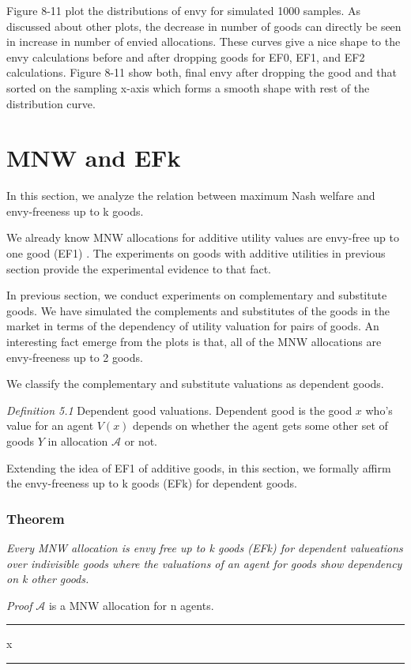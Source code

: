 Figure 8-11 plot the distributions of envy for simulated 1000 samples. As discussed about other plots, the decrease in number of goods can directly be seen in increase in number of envied allocations. These curves give a nice shape to the envy calculations before and after dropping goods for EF0, EF1, and EF2 calculations. Figure 8-11 show both, final envy after dropping the good and that sorted on the sampling x-axis which forms a smooth shape with rest of the distribution curve.

\section{MNW and EFk}
In this section, we analyze the relation between maximum Nash welfare and envy-freeness up to k goods.

We already know MNW allocations for additive utility values are envy-free up to one good (EF1) \cite{caragiannis2016unreasonable}. The experiments on goods with additive utilities in previous section provide the experimental evidence to that fact.

In previous section, we conduct experiments on complementary and substitute goods. We have simulated the complements and substitutes of the goods in the market in terms of the dependency of utility valuation for pairs of goods. An interesting fact emerge from the plots is that, all of the MNW allocations are envy-freeness up to 2 goods.

We classify the complementary and substitute valuations as dependent goods.

\textit{Definition 5.1} Dependent good valuations.
Dependent good is the good $x$ who's value for an agent $V(x)$ depends on whether the agent gets some other set of goods $Y$ in allocation $\mathcal{A}$ or not.

Extending the idea of EF1 of additive goods, in this section, we formally affirm the envy-freeness up to k goods (EFk) for dependent goods.

\subsubsection{Theorem} \textit{Every MNW allocation is envy free up to k goods (EFk) for dependent valueations over indivisible goods where the valuations of an agent for goods show dependency on k other goods.}

\textit{Proof} $\mathcal{A}$ is a MNW allocation for n agents. 


\hrule
x
\hrule

